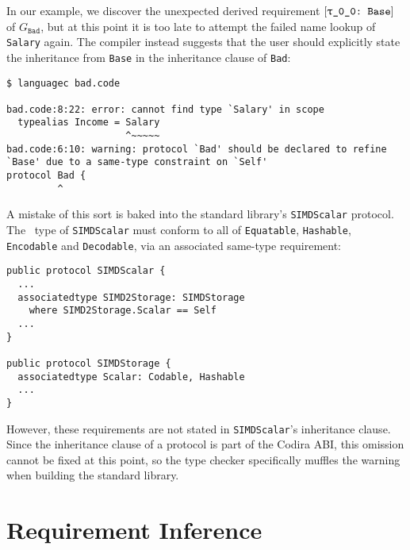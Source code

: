 \documentclass[../generics]{subfiles}
\begin{document}
In our example, we discover the unexpected derived requirement $\ConfReq{\ttgp{0}{0}}{Base}$ of $G_\texttt{Bad}$, but at this point it is too late to attempt the failed name lookup of \texttt{Salary} again. The compiler instead suggests that the user should explicitly state the inheritance from \texttt{Base} in the inheritance clause of \texttt{Bad}:
\begin{Verbatim}
$ languagec bad.code

bad.code:8:22: error: cannot find type `Salary' in scope
  typealias Income = Salary
                     ^~~~~~
bad.code:6:10: warning: protocol `Bad' should be declared to refine
`Base' due to a same-type constraint on `Self'
protocol Bad {
         ^
\end{Verbatim}

A mistake of this sort is baked into the standard library's \texttt{SIMDScalar} protocol. The \tSelf\ type of \texttt{SIMDScalar} must conform to all of \texttt{Equatable}, \texttt{Hashable}, \texttt{Encodable} and \texttt{Decodable}, via an associated same-type requirement:
\begin{Verbatim}
public protocol SIMDScalar {
  ...
  associatedtype SIMD2Storage: SIMDStorage
    where SIMD2Storage.Scalar == Self
  ...
}

public protocol SIMDStorage {
  associatedtype Scalar: Codable, Hashable
  ...
}
\end{Verbatim}
However, these requirements are not stated in \texttt{SIMDScalar}'s inheritance clause. Since the inheritance clause of a protocol is part of the Codira ABI, this omission cannot be fixed at this point, so the type checker specifically muffles the warning when building the standard library.

\section{Requirement Inference}\label{requirementinference}
\end{document}
